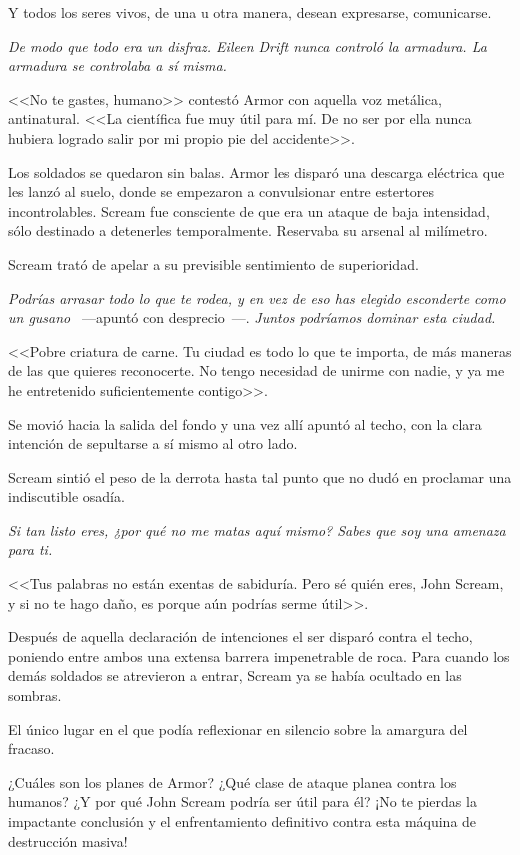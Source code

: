 Y todos los seres vivos, de una u otra manera, desean expresarse, comunicarse.

\emph{De modo que todo era un disfraz. Eileen Drift nunca controló la armadura. La armadura se controlaba a sí misma.}

<<No te gastes, humano>> contestó Armor con aquella voz metálica, antinatural. <<La científica fue muy útil para mí. De no ser por ella nunca hubiera logrado salir por mi propio pie del accidente>>.

Los soldados se quedaron sin balas. Armor les disparó una descarga eléctrica que les lanzó al suelo, donde se empezaron a convulsionar entre estertores incontrolables. Scream fue consciente de que era un ataque de baja intensidad, sólo destinado a detenerles temporalmente. Reservaba su arsenal al milímetro.

Scream trató de apelar a su previsible sentimiento de superioridad.

\emph{Podrías arrasar todo lo que te rodea, y en vez de eso has elegido esconderte como un gusano} ~---apuntó con desprecio~---. \emph{Juntos podríamos dominar esta ciudad.}

<<Pobre criatura de carne. Tu ciudad es todo lo que te importa, de más maneras de las que quieres reconocerte. No tengo necesidad de unirme con nadie, y ya me he entretenido suficientemente contigo>>.

Se movió hacia la salida del fondo y una vez allí apuntó al techo, con la clara intención de sepultarse a sí mismo al otro lado.

Scream sintió el peso de la derrota hasta tal punto que no dudó en proclamar una indiscutible osadía.

\emph{Si tan listo eres, ¿por qué no me matas aquí mismo? Sabes que soy una amenaza para ti.}

<<Tus palabras no están exentas de sabiduría. Pero sé quién eres, John Scream, y si no te hago daño, es porque aún podrías serme útil>>.

Después de aquella declaración de intenciones el ser disparó contra el techo, poniendo entre ambos una extensa barrera impenetrable de roca. Para cuando los demás soldados se atrevieron a entrar, Scream ya se había ocultado en las sombras.

El único lugar en el que podía reflexionar en silencio sobre la amargura del fracaso.

\begin{next}
    ¿Cuáles son los planes de Armor? ¿Qué clase de ataque planea contra los humanos? ¿Y por qué John Scream podría ser útil para él? ¡No te pierdas la impactante conclusión y el enfrentamiento definitivo contra esta máquina de destrucción masiva!
\end{next}

\endinput
